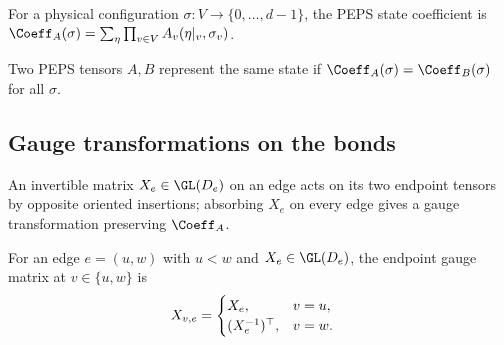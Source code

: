 \begin{definition}
    \label{def:peps_stateCoeff}
    \leanok
    For a physical configuration $\sigma:V\to\{0,\ldots,d-1\}$, the PEPS state
    coefficient is
    $\Coeff_A(\sigma)=\sum_{\eta}\prod_{v\in V}A_v(\eta|_v,\sigma_v)$.
\end{definition}

\begin{definition}
    \label{def:peps_same_state}
    \leanok
    Two PEPS tensors $A,B$ represent the same state if
    $\Coeff_A(\sigma)=\Coeff_B(\sigma)$ for all $\sigma$.
\end{definition}

\subsection{Gauge transformations on the bonds}

An invertible matrix $X_e\in\GL(D_e)$ on an edge acts on its two endpoint
tensors by opposite oriented insertions; absorbing $X_e$ on every edge gives a
gauge transformation preserving $\Coeff_A$.

\begin{definition}%
    \label{def:edgeGaugeAt}
    \leanok
    For an edge $e=(u,w)$ with $u<w$ and $X_e\in\GL(D_e)$, the endpoint gauge
    matrix at $v\in\{u,w\}$ is
    \begin{align}
        X_{v,e}
         & =
        \begin{cases}
            X_e,             & v=u, \\
            (X_e^{-1})^\top, & v=w.
        \end{cases}
        \notag
    \end{align}
\end{definition}

